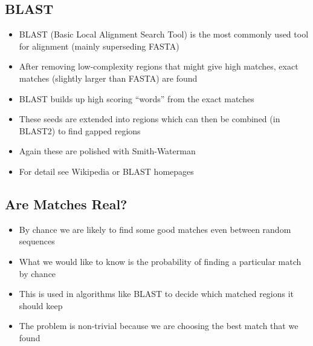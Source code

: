 
\begin{slide}
\section[-2]{BLAST}

\begin{PauseHighLight}
  \begin{itemize}
  \item BLAST (Basic Local Alignment Search Tool) is the most commonly
    used tool for alignment (mainly superseding FASTA)\pause
  \item After removing low-complexity regions that might give high
    matches, exact matches (slightly larger than FASTA) are found\pause
  \item BLAST builds up high scoring ``words'' from the exact matches\pause
  \item These seeds are extended into regions which can then be combined
    (in BLAST2) to find gapped regions\pause
  \item Again these are polished with Smith-Waterman\pause
  \item For detail see Wikipedia or BLAST homepages\pause
  \end{itemize}
\end{PauseHighLight}

\end{slide}


\Outline %

\begin{slide}
\section{Are Matches Real?}

\begin{PauseHighLight}
  \begin{itemize}
  \item By chance we are likely to find some good matches even between
    random sequences\pause
  \item What we would like to know is the probability of finding a
    particular match by chance\pause
  \item This is used in algorithms like BLAST to decide which matched
    regions it should keep\pause
  \item The problem is non-trivial because we are choosing the best
    match that we found\pause
  \end{itemize}
\end{PauseHighLight}

\end{slide}

